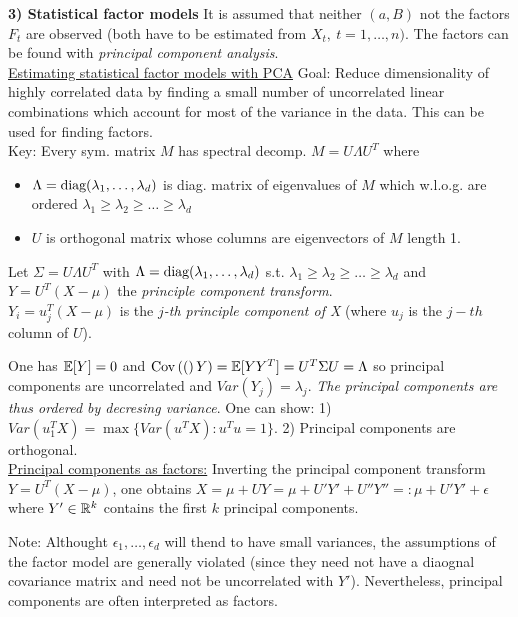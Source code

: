 \textbf{3) Statistical factor models} It is assumed that neither $(a,B)$ not the factors $F_t$ are observed (both have to be estimated from $X_t, \ t = 1, \dots , n)$. The factors can be found with \textit{principal component analysis}. \\
\underline{Estimating statistical factor models with PCA} Goal: Reduce dimensionality of highly correlated data by finding a small number of uncorrelated linear combinations which account for most of the variance in the data. This can be used for finding factors. \\
Key: Every sym. matrix $M$ has spectral decomp. $M = U \Lambda U^T$ where
\begin{itemize}
    \item $\Lambda = \text{diag}(\lambda_1,\dots,\lambda_d)$ is diag. matrix of eigenvalues of $M$ which w.l.o.g. are ordered $\lambda_1 \geq \lambda_2 \geq \dots \geq \lambda_d$
    \item $U$ is orthogonal matrix whose columns are eigenvectors of $M$ length 1.
\end{itemize}
Let $\Sigma = U \Lambda U^T$ with $\Lambda = \text{diag}(\lambda_1,\dots,\lambda_d)$ s.t. $\lambda_1 \geq \lambda_2 \geq \dots \geq \lambda_d$ and $Y = U^T(X-\mu)$ the \textit{principle component transform}. \\
$Y_i = u_j^T(X-\mu)$ is the \textit{$j$-th principle component of X} (where $u_j$ is the $j-th$ column of $U$).

One has $\mathbb{E}[Y] = 0$ and $\operatorname{Cov}\left(( \right)Y) = \mathbb{E}[YY^T] = U^T\Sigma U= \Lambda$ so principal components are uncorrelated and $Var(Y_j) = \lambda_j$. \textit{The principal components are thus ordered by decresing variance}.
One can show: 1) $Var(u_1^TX) = \max\{Var(u^TX) : u^Tu = 1 \}$. 2) Principal components are orthogonal. \\
\underline{Principal components as factors:} Inverting the principal component transform $Y = U^T(X - \mu)$, one obtains $X = \mu + UY = \mu + U'Y' + U''Y'' =: \mu + U' Y' + \epsilon$ where $Y' \in \mathbb{R}^k$ contains the first $k$ principal components.

Note: Althought $\epsilon_1, \dots, \epsilon_d$ will thend to have small variances, the assumptions of the factor model are generally violated (since they need not have a diaognal covariance matrix and need not be uncorrelated with $Y'$). Nevertheless, principal components are often interpreted as factors.